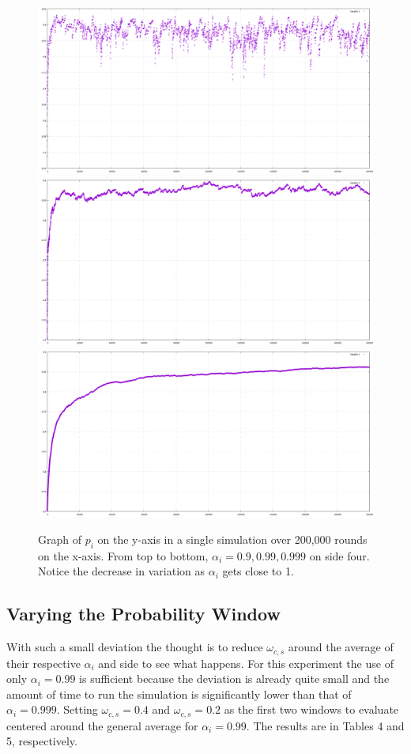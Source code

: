 \documentclass{article}
\begin{document}
\begin{figure}[htp]
\centering
\includegraphics[width=.8\textwidth]{images/ai9side4x200000}\hfill
\includegraphics[width=.8\textwidth]{images/ai99side4x200000}\hfill
\includegraphics[width=.8\textwidth]{images/ai999side4x200000}
\caption{Graph of $p_i$ on the y-axis in a single simulation over 200,000 rounds on the x-axis. From top to bottom, $\alpha_i = 0.9, 0.99, 0.999$ on side four.  Notice the decrease in variation as $\alpha_i$ gets close to 1.}
\label{fig:figure3}
\end{figure}

\subsection{Varying the Probability Window}

With such a small deviation the thought is to reduce $\omega_{c,s}$ around the average of their respective $\alpha_i$ and side to see what happens.  For this experiment the use of only $\alpha_i = 0.99$ is sufficient because the deviation is already quite small and the amount of time to run the simulation is significantly lower than that of $\alpha_i = 0.999$.  Setting $\omega_{c,s} = 0.4$ and $\omega_{c,s} = 0.2$ as the first two windows to evaluate centered around the general average for $\alpha_i =  0.99$.  The results are in Tables 4 and 5, respectively.
\end{document}
